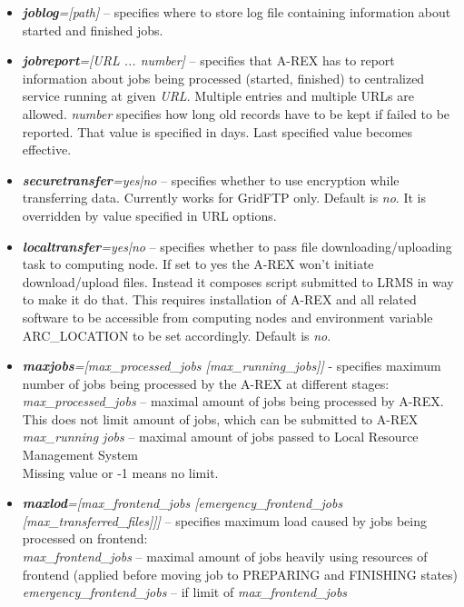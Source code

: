 \documentclass{article}                            %
\begin{document}
\begin{itemize}
\item \textbf{\textit{joblog}}\textit{={[}path]} -- specifies where to store
log file containing information about started and finished jobs.
\item \textbf{\textit{jobreport}}\textit{={[}URL ... number]} -- specifies
that A-REX has to report information about jobs being processed (started,
finished) to centralized service running at given \textit{URL}. Multiple
entries and multiple URLs are allowed. \textit{number} specifies how
long old records have to be kept if failed to be reported. That value
is specified in days. Last specified value becomes effective.
\item \textbf{\textit{securetransfer}}\textit{=yes|no} -- specifies whether
to use encryption while transferring data. Currently works for GridFTP
only. Default is \emph{no}. It is overridden by value specified in
URL options.
\item \textbf{\textit{localtransfer}}\textit{=yes|no} -- specifies whether
to pass file downloading/uploading task to computing node. If set
to yes the A-REX won't initiate download/upload files. Instead it
composes script submitted to LRMS in way to make it do that. This
requires installation of A-REX and all related software to be accessible
from computing nodes and environment variable ARC\_LOCATION to be
set accordingly. Default is \emph{no}.
\item \textbf{\textit{maxjobs}}\textit{={[}max\_processed\_jobs {[}max\_running\_jobs]]}
- specifies maximum number of jobs being processed by the A-REX at
different stages:\\
\textit{max\_processed\_jobs} -- maximal amount of jobs being processed
by A-REX. This does not limit amount of jobs, which can be submitted
to A-REX\\
\textit{max\_running jobs} -- maximal amount of jobs passed to Local
Resource Management System\\
Missing value or -1 means no limit.
\item \textbf{\textit{maxlod}}\textit{={[}max\_frontend\_jobs {[}emergency\_frontend\_jobs
{[}max\_transferred\_files]]]} -- specifies maximum load caused by
jobs being processed on frontend:\\
\textit{max\_frontend\_jobs} -- maximal amount of jobs heavily using
resources of frontend (applied before moving job to PREPARING and
FINISHING states)\textit{}\\
\textit{emergency\_frontend\_jobs} -- if limit of \textit{max\_frontend\_jobs}

\end{itemize}
\end{document}
